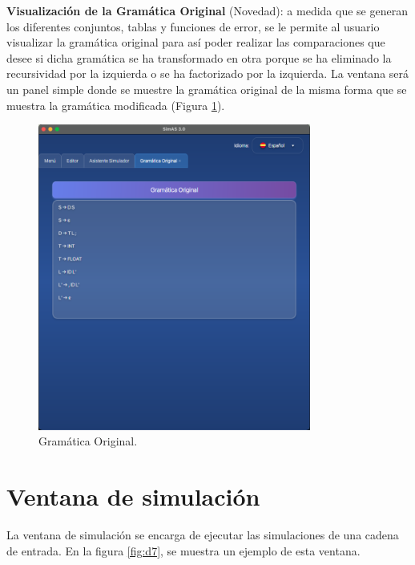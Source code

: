 \textbf{Visualización de la Gramática Original} (Novedad): a medida que se generan los diferentes conjuntos, tablas y funciones de error, se le permite al usuario visualizar la gramática original para así poder realizar las comparaciones que desee si dicha gramática se ha transformado en otra porque se ha eliminado la recursividad por la izquierda o se ha factorizado por la izquierda. La ventana será un panel simple donde se muestre la gramática original de la misma forma que se muestra la gramática modificada (Figura \ref{fig:d10}).

\begin{figure}[htp]
\centering
\includegraphics[width=0.8\textwidth]{figuras2/simulador/gramatica_original.png}
\caption{Gramática Original.}
\label{fig:d10}
\end{figure}

 \section{Ventana de simulación}

La ventana de simulación se encarga de ejecutar las simulaciones de una cadena de entrada. En la figura \ref{fig:d7}, se muestra un ejemplo de esta ventana.

